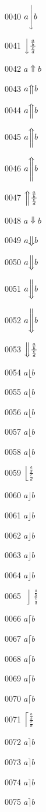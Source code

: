 \documentclass{article}
\begin{document}
0040 $a\Bigg\downarrow b$\par
0041 $\left\downarrow \frac{\frac{a}{b}}{\frac{c}{d}}\right.$\par
0042 $a\Uparrow b$\par
0043 $a\big\Uparrow b$\par
0044 $a\Big\Uparrow b$\par
0045 $a\bigg\Uparrow b$\par
0046 $a\Bigg\Uparrow b$\par
0047 $\left\Uparrow \frac{\frac{a}{b}}{\frac{c}{d}}\right.$\par
0048 $a\Downarrow b$\par
0049 $a\big\Downarrow b$\par
0050 $a\Big\Downarrow b$\par
0051 $a\bigg\Downarrow b$\par
0052 $a\Bigg\Downarrow b$\par
0053 $\left\Downarrow \frac{\frac{a}{b}}{\frac{c}{d}}\right.$\par
0054 $a\lfloor b$\par
0055 $a\big\lfloor b$\par
0056 $a\Big\lfloor b$\par
0057 $a\bigg\lfloor b$\par
0058 $a\Bigg\lfloor b$\par
0059 $\left\lfloor \frac{\frac{a}{b}}{\frac{c}{d}}\right.$\par
0060 $a\rfloor b$\par
0061 $a\big\rfloor b$\par
0062 $a\Big\rfloor b$\par
0063 $a\bigg\rfloor b$\par
0064 $a\Bigg\rfloor b$\par
0065 $\left\rfloor \frac{\frac{a}{b}}{\frac{c}{d}}\right.$\par
0066 $a\lceil b$\par
0067 $a\big\lceil b$\par
0068 $a\Big\lceil b$\par
0069 $a\bigg\lceil b$\par
0070 $a\Bigg\lceil b$\par
0071 $\left\lceil \frac{\frac{a}{b}}{\frac{c}{d}}\right.$\par
0072 $a\rceil b$\par
0073 $a\big\rceil b$\par
0074 $a\Big\rceil b$\par
0075 $a\bigg\rceil b$\par
\end{document}
